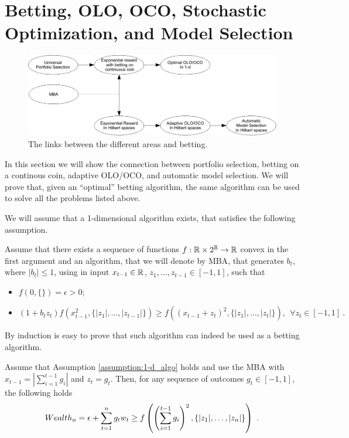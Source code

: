 \section{Betting, OLO, OCO, Stochastic Optimization, and Model Selection}
\label{sec:appl}

\begin{figure}[t]
\centering
\includegraphics[width=.95\linewidth]{./figs/links_between_areas.pdf}
\caption{The links between the different areas and betting.}
\end{figure}

In this section we will show the connection between portfolio selection, betting on a continous coin, adaptive \ac{OLO}/\ac{OCO}, and automatic model selection. We will prove that, given an ``optimal'' betting algorithm, the same algorithm can be used to solve all the problems listed above.

We will assume that a 1-dimensional algorithm exists, that satisfies the following assumption.
\begin{assumption}
\label{assumption:1-d_algo}
Assume that there exists a sequence of functions $f:\mathbb{R} \times 2^{\mathbb{R}} \rightarrow \mathbb{R}$ convex in the first argument and an algorithm, that we will denote by \ac{MBA}, that generates $b_t$, where $|b_t|\leq 1$, using in input $x_{t-1} \in \mathbb{R}$, $z_1, \ldots, z_{t-1} \in [-1,1]$, such that
\begin{itemize}
\item $f(0,\{\})=\epsilon>0$;
\item  \begin{equation}
\label{eq:1_d_hp}
(1+b_t z_t) f\left( x_{t-1}^2, \{|z_1|, \ldots, |z_{t-1}|\} \right) \geq f\left( (x_{t-1}+z_t)^2, \{|z_1|, \ldots, |z_t|\}\right), \ \ \forall z_{t} \in [-1,1]~.
\end{equation}
\end{itemize}
\end{assumption}

By induction is easy to prove that such algorithm can indeed be used as a betting algorithm. 
\begin{theorem}
\label{theo:1-d_reward}
Assume that Assumption \ref{assumption:1-d_algo} holds and use the \ac{MBA} with $x_{t-1}=|\sum_{i=1}^{t-1} g_i|$ and $z_t=g_t$.
Then, for any sequence of outcomes $g_t \in [-1,1]$, the following holds
\[
Wealth_n = \epsilon+\sum_{t=1}^n g_t w_t \geq f\left( \left(\sum_{i=1}^{t-1} g_i \right)^2, \left\{|z_1|, \ldots, |z_n|\right\}\right)~.
\]
\end{theorem}


